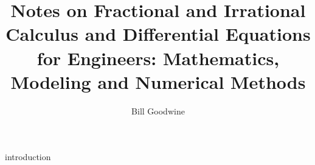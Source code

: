 \documentclass{book}
\title{Notes on Fractional and Irrational Calculus and Differential Equations for Engineers: Mathematics, Modeling and Numerical Methods}
\author{Bill Goodwine}
\begin{document}
\maketitle

{introduction}
\end{document}
